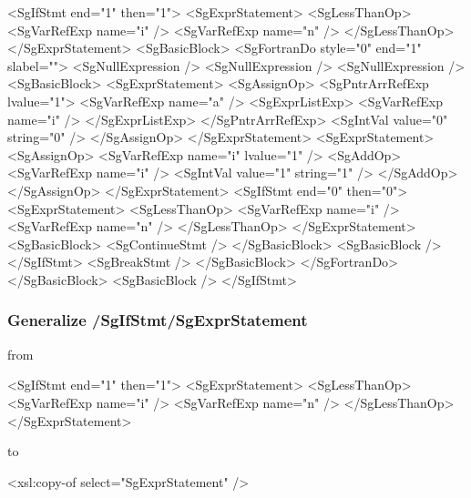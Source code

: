 \begin{framed}
\begin{src}
<SgIfStmt end="1" then="1">
	<SgExprStatement>
		<SgLessThanOp>
			<SgVarRefExp name="i" />
			<SgVarRefExp name="n" />
		</SgLessThanOp>
	</SgExprStatement>
	<SgBasicBlock>
		<SgFortranDo style="0" end="1" slabel="">
			<SgNullExpression />
			<SgNullExpression />
			<SgNullExpression />
			<SgBasicBlock>
				<SgExprStatement>
					<SgAssignOp>
						<SgPntrArrRefExp lvalue="1">
							<SgVarRefExp name="a" />
							<SgExprListExp>
								<SgVarRefExp name="i" />
							</SgExprListExp>
						</SgPntrArrRefExp>
						<SgIntVal value="0" string="0" />
					</SgAssignOp>
				</SgExprStatement>
				<SgExprStatement>
					<SgAssignOp>
						<SgVarRefExp name="i" lvalue="1" />
						<SgAddOp>
							<SgVarRefExp name="i" />
							<SgIntVal value="1" string="1" />
						</SgAddOp>
					</SgAssignOp>
				</SgExprStatement>
				<SgIfStmt end="0" then="0">
					<SgExprStatement>
						<SgLessThanOp>
							<SgVarRefExp name="i" />
							<SgVarRefExp name="n" />
						</SgLessThanOp>
					</SgExprStatement>
					<SgBasicBlock>
						<SgContinueStmt />
					</SgBasicBlock>
					<SgBasicBlock />
				</SgIfStmt>
				<SgBreakStmt />
			</SgBasicBlock>
		</SgFortranDo>
	</SgBasicBlock>
	<SgBasicBlock />
</SgIfStmt>
\end{src}
\end{framed}

\subsubsection{Generalize /SgIfStmt/SgExprStatement}\label{subsubsec:cond}


from

\begin{framed}
\begin{src}
<SgIfStmt end="1" then="1">
	<SgExprStatement>
		<SgLessThanOp>
			<SgVarRefExp name="i" />
			<SgVarRefExp name="n" />
		</SgLessThanOp>
	</SgExprStatement>
\end{src}
\end{framed}

to

\begin{framed}
\begin{src}
		<xsl:copy-of select="SgExprStatement" />
\end{src}
\end{framed}

